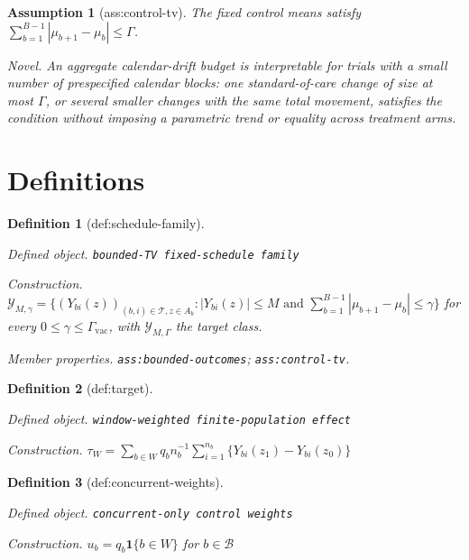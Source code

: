 \documentclass{article}
\newtheorem{assumption}{Assumption}
\newtheorem{definition}{Definition}
\begin{document}
\begin{assumption}[ass:control-tv]\label{ass:control-tv}
The fixed control means satisfy \(\sum_{b=1}^{B-1}|\mu_{b+1}-\mu_b|\le\Gamma\).
\par\smallskip\noindent\emph{Novel.} An aggregate calendar-drift budget is interpretable for trials with a small number of prespecified calendar blocks: one standard-of-care change of size at most \(\Gamma\), or several smaller changes with the same total movement, satisfies the condition without imposing a parametric trend or equality across treatment arms.
\end{assumption}

\section{Definitions}

\begin{definition}[def:schedule-family]\label{def:schedule-family}
\par\smallskip\noindent\emph{Defined object.} \texttt{bounded-\allowbreak{}TV fixed-\allowbreak{}schedule family}
\par\smallskip\noindent\emph{Construction.} \(\mathcal Y_{M,\gamma}=\{(Y_{bi}(z))_{(b,i)\in\mathcal T,z\in A_b}: |Y_{bi}(z)|\le M\text{ and }\sum_{b=1}^{B-1}|\mu_{b+1}-\mu_b|\le\gamma\}\) for every \(0\le\gamma\le\Gamma_{\mathrm{vac}}\), with \(\mathcal Y_{M,\Gamma}\) the target class.
\par\smallskip\noindent\emph{Member properties.} \texttt{ass:\allowbreak{}bounded-\allowbreak{}outcomes}; \texttt{ass:\allowbreak{}control-\allowbreak{}tv}.
\end{definition}

\begin{definition}[def:target]\label{def:target}
\par\smallskip\noindent\emph{Defined object.} \texttt{window-\allowbreak{}weighted finite-\allowbreak{}population effect}
\par\smallskip\noindent\emph{Construction.} \(\tau_W=\sum_{b\in W}q_b n_b^{-1}\sum_{i=1}^{n_b}\{Y_{bi}(z_1)-Y_{bi}(z_0)\}\)
\end{definition}

\begin{definition}[def:concurrent-weights]\label{def:concurrent-weights}
\par\smallskip\noindent\emph{Defined object.} \texttt{concurrent-\allowbreak{}only control weights}
\par\smallskip\noindent\emph{Construction.} \(u_b=q_b\mathbf 1\{b\in W\}\) for \(b\in\mathcal B\)
\end{definition}
\end{document}
